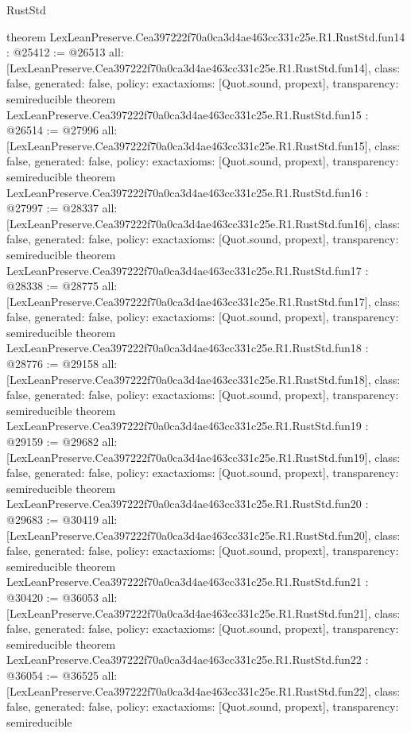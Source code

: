 \begin{lexlean}{RustStd}
\begin{coremodule}
{}
theorem LexLeanPreserve.Cea397222f70a0ca3d4ae463cc331c25e.R1.RustStd.fun14 : @25412 := @26513 {
  all: [LexLeanPreserve.Cea397222f70a0ca3d4ae463cc331c25e.R1.RustStd.fun14],
  class: false,
  generated: false,
  policy: exact{axioms: [Quot.sound, propext]},
  transparency: semireducible
}
theorem LexLeanPreserve.Cea397222f70a0ca3d4ae463cc331c25e.R1.RustStd.fun15 : @26514 := @27996 {
  all: [LexLeanPreserve.Cea397222f70a0ca3d4ae463cc331c25e.R1.RustStd.fun15],
  class: false,
  generated: false,
  policy: exact{axioms: [Quot.sound, propext]},
  transparency: semireducible
}
theorem LexLeanPreserve.Cea397222f70a0ca3d4ae463cc331c25e.R1.RustStd.fun16 : @27997 := @28337 {
  all: [LexLeanPreserve.Cea397222f70a0ca3d4ae463cc331c25e.R1.RustStd.fun16],
  class: false,
  generated: false,
  policy: exact{axioms: [Quot.sound, propext]},
  transparency: semireducible
}
theorem LexLeanPreserve.Cea397222f70a0ca3d4ae463cc331c25e.R1.RustStd.fun17 : @28338 := @28775 {
  all: [LexLeanPreserve.Cea397222f70a0ca3d4ae463cc331c25e.R1.RustStd.fun17],
  class: false,
  generated: false,
  policy: exact{axioms: [Quot.sound, propext]},
  transparency: semireducible
}
theorem LexLeanPreserve.Cea397222f70a0ca3d4ae463cc331c25e.R1.RustStd.fun18 : @28776 := @29158 {
  all: [LexLeanPreserve.Cea397222f70a0ca3d4ae463cc331c25e.R1.RustStd.fun18],
  class: false,
  generated: false,
  policy: exact{axioms: [Quot.sound, propext]},
  transparency: semireducible
}
theorem LexLeanPreserve.Cea397222f70a0ca3d4ae463cc331c25e.R1.RustStd.fun19 : @29159 := @29682 {
  all: [LexLeanPreserve.Cea397222f70a0ca3d4ae463cc331c25e.R1.RustStd.fun19],
  class: false,
  generated: false,
  policy: exact{axioms: [Quot.sound, propext]},
  transparency: semireducible
}
theorem LexLeanPreserve.Cea397222f70a0ca3d4ae463cc331c25e.R1.RustStd.fun20 : @29683 := @30419 {
  all: [LexLeanPreserve.Cea397222f70a0ca3d4ae463cc331c25e.R1.RustStd.fun20],
  class: false,
  generated: false,
  policy: exact{axioms: [Quot.sound, propext]},
  transparency: semireducible
}
theorem LexLeanPreserve.Cea397222f70a0ca3d4ae463cc331c25e.R1.RustStd.fun21 : @30420 := @36053 {
  all: [LexLeanPreserve.Cea397222f70a0ca3d4ae463cc331c25e.R1.RustStd.fun21],
  class: false,
  generated: false,
  policy: exact{axioms: [Quot.sound, propext]},
  transparency: semireducible
}
theorem LexLeanPreserve.Cea397222f70a0ca3d4ae463cc331c25e.R1.RustStd.fun22 : @36054 := @36525 {
  all: [LexLeanPreserve.Cea397222f70a0ca3d4ae463cc331c25e.R1.RustStd.fun22],
  class: false,
  generated: false,
  policy: exact{axioms: [Quot.sound, propext]},
  transparency: semireducible
}
\end{coremodule}
\end{lexlean}

